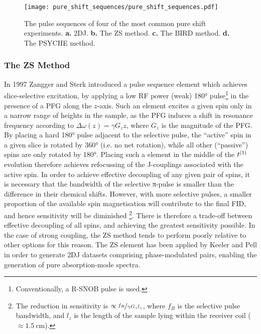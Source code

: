 \begin{figure}
    \centering
    \texttt{[image: pure\_shift\_sequences/pure\_shift\_sequences.pdf]}
    \caption[
        The pulse sequences of some common pure shift experiments.
    ]{
        The pulse sequences of four of the most common pure shift experiments.
        \textbf{a.} \acs{2DJ}.
        \textbf{b.} The \acs{ZS} method.
        \textbf{c.} The \acs{BIRD} method.
        \textbf{d.} The \acs{PSYCHE} method.
    }
    \label{fig:pure_shift_seqs}
\end{figure}

\subsubsection{The \acl{ZS} Method}
\label{subsec:ZS}
In 1997 Zangger and Sterk introduced a pulse sequence element which achieves
slice-selective excitation, by applying a low \ac{RF} power (weak) \ang{180}
pulse\footnote{Conventionally, a R-SNOB pulse is used\cite{Kupce1995}.} in the
presence of a \ac{PFG} along the $z$-axis\cite{Zangger1997}. Such an element
excites a
given spin only in a narrow range of heights in the sample, as the \ac{PFG}
induces a shift in resonance frequency according to $\Delta \omega(z) = \gamma
G_z z$, where $G_z$ is the magnitude of the \ac{PFG}. By placing a hard
\ang{180} pulse adjacent to the selective pulse, the
``active'' spin in a given slice is rotated by \ang{360} (i.e. no net
rotation), while all other (``passive'') spins are only rotated by \ang{180}.
Placing such a element in the middle of the $t^{(1)}$ evolution therefore
achieves refocussing of the J-couplings associated with the active
spin\cite{Aguilar2010}. In order to achieve effective decoupling of any given
pair of spins, it is necessary that the bandwidth of the selective π-pulse is
smaller than the difference in their chemical shifts. However, with more
selective pulses, a smaller proportion of the available spin magnetisation will
contribute to the final FID, and hence sensitivity will be diminished
\footnote{
    The reduction in sensitivity is $\propto \nicefrac{f_B}{\gamma G_z l_z}$,
    where $f_B$ is the selective pulse bandwidth, and $l_z$ is the length of
    the sample lying within the receiver coil ($\approx
    \qty{1.5}{\centi\meter}$).
}.
There is therefore a trade-off between effective decoupling of all spins, and
achieving the greatest sensitivity possible. In the case of strong coupling,
the \ac{ZS} method tends to perform poorly relative to other options for this
reason. The \ac{ZS} element has been applied by Keeler and Pell in order to
generate \ac{2DJ} datasets comprising phase-modulated pairs, enabling the
generation of pure absorption-mode spectra\cite{Pell2007}.


